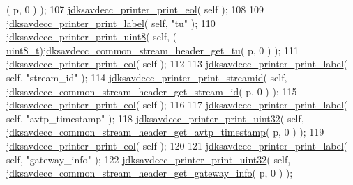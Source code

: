 \begin{DoxyCode}
      ( p, 0 ) );
107                 \hyperlink{group__util_gacda56c9d3d24593a52c999682fa6e6e3}{jdksavdecc\_printer\_print\_eol}( \textcolor{keyword}{self} );
108 
109                 \hyperlink{group__util_gaf7818b24143b3c7502926a425a242ff5}{jdksavdecc\_printer\_print\_label}( \textcolor{keyword}{self}, \textcolor{stringliteral}{"tu"} );
110                 \hyperlink{group__util_ga00205f7730fc39a5b93655a3b18a8dc7}{jdksavdecc\_printer\_print\_uint8}( \textcolor{keyword}{self}, (
      \hyperlink{stdint_8h_aba7bc1797add20fe3efdf37ced1182c5}{uint8\_t})\hyperlink{group__jdksavdecc__avtp__common__stream__header_ga7ca83d1f9672ca4f055f9020712e47c0}{jdksavdecc\_common\_stream\_header\_get\_tu}( p, 0 ) );
111                 \hyperlink{group__util_gacda56c9d3d24593a52c999682fa6e6e3}{jdksavdecc\_printer\_print\_eol}( \textcolor{keyword}{self} );
112 
113                 \hyperlink{group__util_gaf7818b24143b3c7502926a425a242ff5}{jdksavdecc\_printer\_print\_label}( \textcolor{keyword}{self}, \textcolor{stringliteral}{"stream\_id"} );
114                 \hyperlink{group__util_ga8439b1cdb450c02010bc8318643f67a2}{jdksavdecc\_printer\_print\_streamid}( \textcolor{keyword}{self}, 
      \hyperlink{group__jdksavdecc__avtp__common__stream__header_gaaeb4237cce0457e51e4ca3b39ef4441c}{jdksavdecc\_common\_stream\_header\_get\_stream\_id}( p, 0 ) );
115                 \hyperlink{group__util_gacda56c9d3d24593a52c999682fa6e6e3}{jdksavdecc\_printer\_print\_eol}( \textcolor{keyword}{self} );
116 
117                 \hyperlink{group__util_gaf7818b24143b3c7502926a425a242ff5}{jdksavdecc\_printer\_print\_label}( \textcolor{keyword}{self}, \textcolor{stringliteral}{"avtp\_timestamp"} );
118                 \hyperlink{group__util_ga5ab4b0ba019ff6f6aa9d95d77560b294}{jdksavdecc\_printer\_print\_uint32}( \textcolor{keyword}{self}, 
      \hyperlink{group__jdksavdecc__avtp__common__stream__header_gae53726ce341a081a49329cf0381f7700}{jdksavdecc\_common\_stream\_header\_get\_avtp\_timestamp}( p, 0 
      ) );
119                 \hyperlink{group__util_gacda56c9d3d24593a52c999682fa6e6e3}{jdksavdecc\_printer\_print\_eol}( \textcolor{keyword}{self} );
120 
121                 \hyperlink{group__util_gaf7818b24143b3c7502926a425a242ff5}{jdksavdecc\_printer\_print\_label}( \textcolor{keyword}{self}, \textcolor{stringliteral}{"gateway\_info"} );
122                 \hyperlink{group__util_ga5ab4b0ba019ff6f6aa9d95d77560b294}{jdksavdecc\_printer\_print\_uint32}( \textcolor{keyword}{self}, 
      \hyperlink{group__jdksavdecc__avtp__common__stream__header_gad76bbc0ce29346ee5830370a6288dfb0}{jdksavdecc\_common\_stream\_header\_get\_gateway\_info}( p, 0 ) );

\end{DoxyCode}
